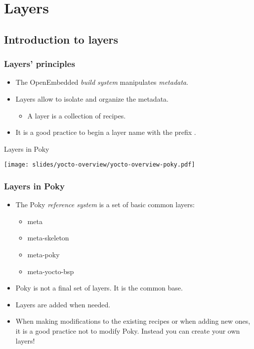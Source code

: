 \section{Layers}

\subsection{Introduction to layers}

\begin{frame}
  \frametitle{Layers' principles}
  \begin{itemize}
    \item The OpenEmbedded \emph{build system} manipulates
          \emph{metadata}.
    \item Layers allow to isolate and organize the metadata.
    \begin{itemize}
      \item A layer is a collection of recipes.
    \end{itemize}
    \item It is a good practice to begin a layer name with the prefix
      .
  \end{itemize}
\end{frame}

\begin{frame}{Layers in Poky}
  \begin{center}
    \texttt{[image: slides/yocto-overview/yocto-overview-poky.pdf]}
  \end{center}
\end{frame}

\begin{frame}
  \frametitle{Layers in Poky}
  \begin{itemize}
    \item The Poky \emph{reference system} is a set of basic common
          layers:
    \begin{itemize}
      \item meta
      \item meta-skeleton
      \item meta-poky
      \item meta-yocto-bsp
    \end{itemize}
    \item Poky is not a final set of layers. It is the common base.
    \item Layers are added when needed.
    \item When making modifications to the existing recipes or when
      adding new ones, it is a good practice not to modify Poky.
      Instead you can create your own layers!
  \end{itemize}
\end{frame}

